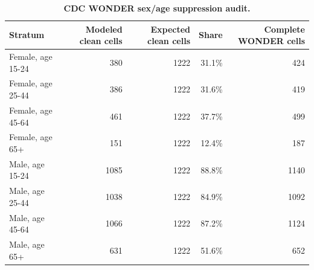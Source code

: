 \begin{table}[H]
\centering
\caption{\textbf{CDC WONDER sex/age suppression audit.}}
\label{tab:sex_age_suppression}
\begin{tabular}{lrrrr}
\toprule
Stratum & Modeled clean cells & Expected clean cells & Share & Complete WONDER cells \\
\midrule
Female, age 15-24 & 380 & 1222 & 31.1\% & 424 \\
Female, age 25-44 & 386 & 1222 & 31.6\% & 419 \\
Female, age 45-64 & 461 & 1222 & 37.7\% & 499 \\
Female, age 65+ & 151 & 1222 & 12.4\% & 187 \\
Male, age 15-24 & 1085 & 1222 & 88.8\% & 1140 \\
Male, age 25-44 & 1038 & 1222 & 84.9\% & 1092 \\
Male, age 45-64 & 1066 & 1222 & 87.2\% & 1124 \\
Male, age 65+ & 631 & 1222 & 51.6\% & 652 \\
\bottomrule
\end{tabular}
\end{table}
